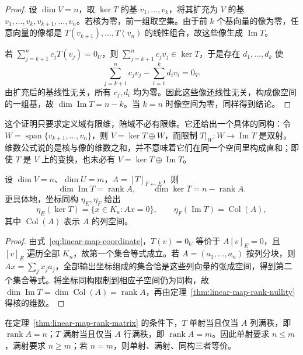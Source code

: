 \begin{proof}
设 $\dim V=n$，取 $\ker T$ 的基 $v_1,\ldots,v_k$，将其扩充为 $V$ 的基 $v_1,\ldots,v_k,v_{k+1},\ldots,v_n$。若核为零，前一组取空集。由于前 $k$ 个基向量的像为零，任意向量的像都是 $T(v_{k+1}),\ldots,T(v_n)$ 的线性组合，故这些像生成 $\operatorname{Im}T$。

若 $\sum_{j=k+1}^n c_jT(v_j)=0_U$，则 $\sum_{j=k+1}^n c_jv_j\in\ker T$，于是存在 $d_1,\ldots,d_k$ 使
\[
    \sum_{j=k+1}^n c_jv_j-\sum_{i=1}^k d_iv_i=0_V.
\]
由扩充后的基线性无关，所有 $c_j,d_i$ 均为零。因此这些像还线性无关，构成像空间的一组基，故 $\dim\operatorname{Im}T=n-k$。当 $k=n$ 时像空间为零，同样得到结论。
\end{proof}

这个证明只要求定义域有限维，陪域不必有限维。它还给出一个具体的同构：令 $W=\operatorname{span}\{v_{k+1},\ldots,v_n\}$，则 $V=\ker T\oplus W$，而限制 $T|_W:W\to\operatorname{Im}T$ 是双射。维数公式说的是核与像的维数之和，并不意味着它们在同一个空间里构成直和；即使 $T$ 是 $V$ 上的变换，也未必有 $V=\ker T\oplus\operatorname{Im}T$。

\begin{theorem}
\label{thm:linear-map-rank-matrix}
设 $\dim V=n$、$\dim U=m$，$A=[T]_{F\leftarrow E}$，则
\begin{equation}
\label{eq:linear-map-rank-matrix}
    \dim\operatorname{Im}T=\operatorname{rank}A,
    \qquad \dim\ker T=n-\operatorname{rank}A.
\end{equation}
更具体地，坐标同构 $\eta_E,\eta_F$ 给出
\[
    \eta_E(\ker T)=\{x\in K_n:Ax=0\},
    \qquad \eta_F(\operatorname{Im}T)=\operatorname{Col}(A),
\]
其中 $\operatorname{Col}(A)$ 表示 $A$ 的列空间。
\end{theorem}

\begin{proof}
由式~\eqref{eq:linear-map-coordinate}，$T(v)=0_U$ 等价于 $A[v]_E=0$，且 $[v]_E$ 遍历全部 $K_n$，故第一个集合等式成立。若 $A=(a_1,\ldots,a_n)$ 按列分块，则 $Ax=\sum_jx_ja_j$，全部输出坐标组成的集合恰是这些列向量的张成空间，得到第二个集合等式。将坐标同构限制到相应子空间仍为同构，故 $\dim\operatorname{Im}T=\dim\operatorname{Col}(A)=\operatorname{rank}A$，再由定理~\ref{thm:linear-map-rank-nullity} 得核的维数。
\end{proof}

\begin{corollary}
\label{cor:linear-map-injective-surjective-rank}
在定理~\ref{thm:linear-map-rank-matrix} 的条件下，$T$ 单射当且仅当 $A$ 列满秩，即 $\operatorname{rank}A=n$；$T$ 满射当且仅当 $A$ 行满秩，即 $\operatorname{rank}A=m$。因此单射要求 $n\leq m$，满射要求 $n\geq m$；若 $n=m$，则单射、满射、同构三者等价。
\end{corollary}

